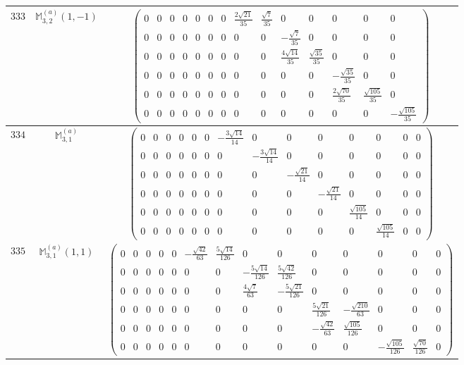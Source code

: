 \documentclass[fleqn,8pt,landscape]{jsarticle}
\begin{document}
\begin{center}
\begin{longtable}{ccc}
$ 333 $ & $ \mathbb{M}_{3,2}^{(a)}(1,-1) $ & $ \begin{pmatrix} 0 & 0 & 0 & 0 & 0 & 0 & 0 & \frac{2 \sqrt{21}}{35} & \frac{\sqrt{7}}{35} & 0 & 0 & 0 & 0 & 0 \\ 0 & 0 & 0 & 0 & 0 & 0 & 0 & 0 & 0 & - \frac{\sqrt{7}}{35} & 0 & 0 & 0 & 0 \\ 0 & 0 & 0 & 0 & 0 & 0 & 0 & 0 & 0 & \frac{4 \sqrt{14}}{35} & \frac{\sqrt{35}}{35} & 0 & 0 & 0 \\ 0 & 0 & 0 & 0 & 0 & 0 & 0 & 0 & 0 & 0 & 0 & - \frac{\sqrt{35}}{35} & 0 & 0 \\ 0 & 0 & 0 & 0 & 0 & 0 & 0 & 0 & 0 & 0 & 0 & \frac{2 \sqrt{70}}{35} & \frac{\sqrt{105}}{35} & 0 \\ 0 & 0 & 0 & 0 & 0 & 0 & 0 & 0 & 0 & 0 & 0 & 0 & 0 & - \frac{\sqrt{105}}{35} \end{pmatrix} $ \\ \hline
$ 334 $ & $ \mathbb{M}_{3,1}^{(a)} $ & $ \begin{pmatrix} 0 & 0 & 0 & 0 & 0 & 0 & - \frac{3 \sqrt{14}}{14} & 0 & 0 & 0 & 0 & 0 & 0 & 0 \\ 0 & 0 & 0 & 0 & 0 & 0 & 0 & - \frac{3 \sqrt{14}}{14} & 0 & 0 & 0 & 0 & 0 & 0 \\ 0 & 0 & 0 & 0 & 0 & 0 & 0 & 0 & - \frac{\sqrt{21}}{14} & 0 & 0 & 0 & 0 & 0 \\ 0 & 0 & 0 & 0 & 0 & 0 & 0 & 0 & 0 & - \frac{\sqrt{21}}{14} & 0 & 0 & 0 & 0 \\ 0 & 0 & 0 & 0 & 0 & 0 & 0 & 0 & 0 & 0 & \frac{\sqrt{105}}{14} & 0 & 0 & 0 \\ 0 & 0 & 0 & 0 & 0 & 0 & 0 & 0 & 0 & 0 & 0 & \frac{\sqrt{105}}{14} & 0 & 0 \end{pmatrix} $ \\ \hline
$ 335 $ & $ \mathbb{M}_{3,1}^{(a)}(1,1) $ & $ \begin{pmatrix} 0 & 0 & 0 & 0 & 0 & - \frac{\sqrt{42}}{63} & \frac{5 \sqrt{14}}{126} & 0 & 0 & 0 & 0 & 0 & 0 & 0 \\ 0 & 0 & 0 & 0 & 0 & 0 & 0 & - \frac{5 \sqrt{14}}{126} & \frac{5 \sqrt{42}}{126} & 0 & 0 & 0 & 0 & 0 \\ 0 & 0 & 0 & 0 & 0 & 0 & 0 & \frac{4 \sqrt{7}}{63} & - \frac{5 \sqrt{21}}{126} & 0 & 0 & 0 & 0 & 0 \\ 0 & 0 & 0 & 0 & 0 & 0 & 0 & 0 & 0 & \frac{5 \sqrt{21}}{126} & - \frac{\sqrt{210}}{63} & 0 & 0 & 0 \\ 0 & 0 & 0 & 0 & 0 & 0 & 0 & 0 & 0 & - \frac{\sqrt{42}}{63} & \frac{\sqrt{105}}{126} & 0 & 0 & 0 \\ 0 & 0 & 0 & 0 & 0 & 0 & 0 & 0 & 0 & 0 & 0 & - \frac{\sqrt{105}}{126} & \frac{\sqrt{70}}{126} & 0 \end{pmatrix} $ \\ \hline

\end{longtable}
\end{center}
\end{document}
